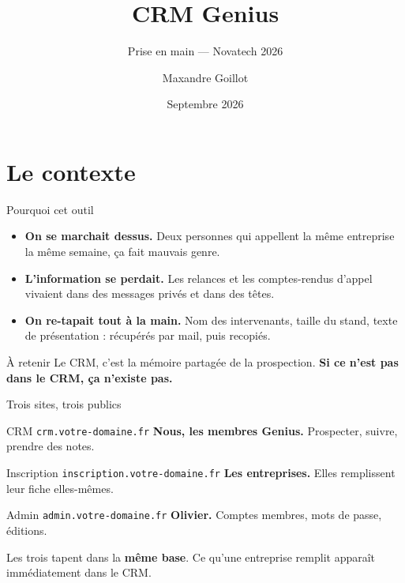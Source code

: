 \documentclass[aspectratio=169,11pt]{beamer}
\title{CRM Genius}
\subtitle{Prise en main --- Novatech 2026}
\author{Maxandre Goillot}
\institute{Genius CentraleSupélec}
\date{Septembre 2026}
\newcommand{\domaine}{votre-domaine.fr}
\newcommand{\cle}[1]{\textbf{\textcolor{noirApp}{#1}}}
\newcommand{\lien}[1]{\texttt{\footnotesize #1}}
\begin{document}
\maketitle

\section{Le contexte}

\begin{frame}{Pourquoi cet outil}
  \begin{itemize}
    \item \cle{On se marchait dessus.} Deux personnes qui appellent la même
          entreprise la même semaine, ça fait mauvais genre.
    \item \cle{L'information se perdait.} Les relances et les comptes-rendus
          d'appel vivaient dans des messages privés et dans des têtes.
    \item \cle{On re-tapait tout à la main.} Nom des intervenants, taille du
          stand, texte de présentation : récupérés par mail, puis recopiés.
  \end{itemize}

  \vfill
  \begin{block}{À retenir}
    Le CRM, c'est la mémoire partagée de la prospection.
    \textbf{Si ce n'est pas dans le CRM, ça n'existe pas.}
  \end{block}
\end{frame}

\begin{frame}{Trois sites, trois publics}
  \begin{block}{CRM \quad\normalfont\lien{crm.\domaine}}
    \textbf{Nous, les membres Genius.} Prospecter, suivre, prendre des notes.
  \end{block}

  \begin{block}{Inscription \quad\normalfont\lien{inscription.\domaine}}
    \textbf{Les entreprises.} Elles remplissent leur fiche elles-mêmes.
  \end{block}

  \begin{block}{Admin \quad\normalfont\lien{admin.\domaine}}
    \textbf{Olivier.} Comptes membres, mots de passe, éditions.
  \end{block}

  \vfill
  \centering\small
  Les trois tapent dans la \cle{même base}. Ce qu'une entreprise remplit
  apparaît immédiatement dans le CRM.
\end{frame}
\end{document}
